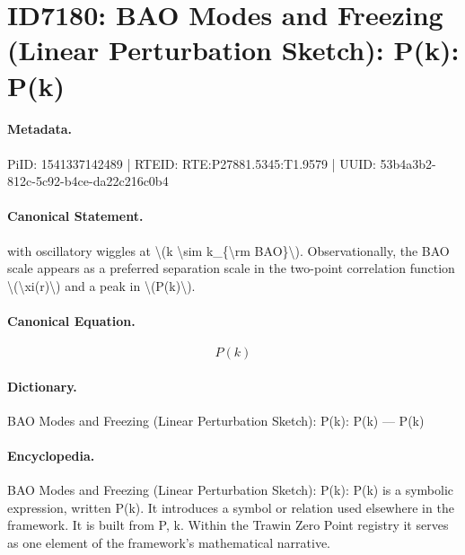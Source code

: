\section*{ID7180: BAO Modes and Freezing (Linear Perturbation Sketch): P(k): P(k)}
\paragraph{Metadata.}
PiID: 1541337142489 | RTEID: RTE:P27881.5345:T1.9579 | UUID: 53b4a3b2-812c-5c92-b4ce-da22c216c0b4

\paragraph{Canonical Statement.}
with oscillatory wiggles at \textbackslash{}(k \textbackslash{}sim k\_\{\textbackslash{}rm BAO\}\textbackslash{}). Observationally, the BAO scale appears as a preferred separation scale in the two-point correlation function \textbackslash{}(\textbackslash{}xi(r)\textbackslash{}) and a peak in \textbackslash{}(P(k)\textbackslash{}).

\paragraph{Canonical Equation.}
\[
P(k)
\]

\paragraph{Dictionary.}
BAO Modes and Freezing (Linear Perturbation Sketch): P(k): P(k) — P(k)

\paragraph{Encyclopedia.}
BAO Modes and Freezing (Linear Perturbation Sketch): P(k): P(k) is a symbolic expression, written P(k). It introduces a symbol or relation used elsewhere in the framework. It is built from P, k. Within the Trawin Zero Point registry it serves as one element of the framework's mathematical narrative.
